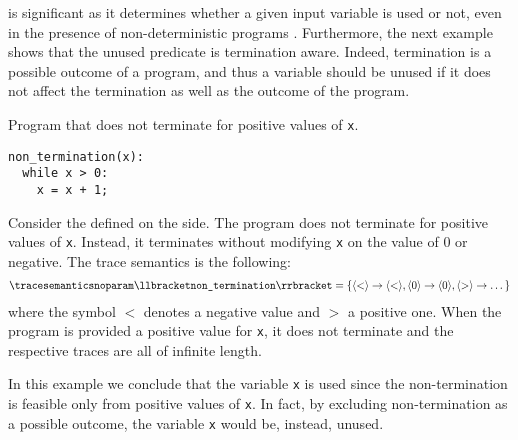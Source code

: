 is significant as it determines whether a given input variable is used or not, even in the presence of non-deterministic programs%
.
Furthermore, the next example shows that the unused predicate is termination aware.
Indeed, termination is a possible outcome of a program, and thus a variable should be unused if it does not affect the termination as well as the outcome of the program.

\begin{example}
  \begin{marginlisting}
    \caption{Program that does not terminate for positive values of \texttt{x}.}
    \vspace{2\lineheight}
  \begin{lstlisting}
non_termination(x):
  while x > 0:
    x = x + 1;
\end{lstlisting}
  \end{marginlisting}
  Consider the  defined on the side. The program does not terminate for positive values of \texttt{x}. Instead, it terminates without modifying \texttt{x} on the value of $0$ or negative. The trace semantics is the following:
  \begin{align*}
    \tracesemanticsnoparam\semanticsof{\texttt{non\_termination}}
    =
    \{
      \langle{<}\rangle\rightarrow\langle{<}\rangle,
      \langle{0}\rangle\rightarrow\langle{0}\rangle,
      \langle{>}\rangle\rightarrow\dots
    \}
  \end{align*}
  where the symbol $<$ denotes a negative value and $>$ a positive one. When the program is provided a positive value for \texttt{x}, it does not terminate and the respective traces are all of infinite length.

  In this example we conclude that the variable \texttt{x} is used since the non-termination is feasible only from positive values of \texttt{x}.
  In fact, by excluding non-termination as a possible outcome, the variable \texttt{x} would be, instead, unused.
\end{example}

